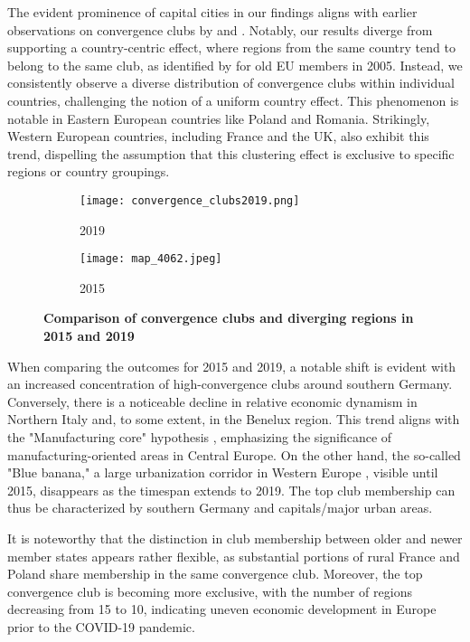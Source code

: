 \documentclass[11pt]{article}
\begin{document}
The evident prominence of capital cities in our findings aligns with earlier observations on convergence clubs by \citet{sme2012regional} and \citet{bartkowska2012regional}. Notably, our results diverge from supporting a country-centric effect, where regions from the same country tend to belong to the same club, as identified by \citet{bartkowska2012regional} for old EU members in 2005. Instead, we consistently observe a diverse distribution of convergence clubs within individual countries, challenging the notion of a uniform country effect. This phenomenon is notable in Eastern European countries like Poland and Romania. Strikingly, Western European countries, including France and the UK, also exhibit this trend, dispelling the assumption that this clustering effect is exclusive to specific regions or country groupings.

\begin{figure}[!htbp]%
\centering
\begin{subfigure}[c]{0.77\linewidth}
  {
  \texttt{[image: convergence\_clubs2019.png]}
    \caption{2019}
    \label{clubs_graphic_2019}
  }
\end{subfigure}
\qquad
\begin{subfigure}[c]{0.77\linewidth}
  \texttt{[image: map\_4062.jpeg]}
  \caption{2015}
  \label{clubs_graphic_2015}
\end{subfigure}
  \caption{\textbf{Comparison of convergence clubs and diverging regions in 2015 and 2019}}
\label{clubs_graphic}
\end{figure} 

When comparing the outcomes for 2015 and 2019, a notable shift is evident with an increased concentration of high-convergence clubs around southern Germany. Conversely, there is a noticeable decline in relative economic dynamism in Northern Italy and, to some extent, in the Benelux region. This trend aligns with the "Manufacturing core" hypothesis \citep{cutrini2019economic, stollinger2016structural}, emphasizing the significance of manufacturing-oriented areas in Central Europe. On the other hand, the so-called "Blue banana," a large urbanization corridor in Western Europe \citep{hospers2002beyond}, visible until 2015, disappears as the timespan extends to 2019. The top club membership can thus be characterized by southern Germany and capitals/major urban areas.

It is noteworthy that the distinction in club membership between older and newer member states appears rather flexible, as substantial portions of rural France and Poland share membership in the same convergence club. Moreover, the top convergence club is becoming more exclusive, with the number of regions decreasing from 15 to 10,  indicating uneven economic development in Europe prior to the COVID-19 pandemic.
\end{document}
